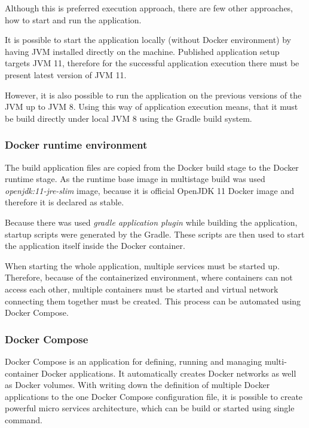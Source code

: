 Although this is preferred execution approach,
there are few other approaches,
how to start and run the application.

It is possible to start the application locally (without Docker environment) by having JVM installed directly on the machine.
Published application setup targets JVM 11, 
therefore for the successful application execution there must be present latest version of JVM 11.

However,
it is also possible to run the application on the previous versions of the JVM up to JVM 8.
Using this way of application execution means,
that it must be build directly under local JVM 8 using the Gradle build system.

\subsubsection{Docker runtime environment}\label{subsubsec:docker-runtime-env}
The build application files are copied from the Docker build stage to the Docker runtime stage.
As the runtime base image in multistage build was used \textit{openjdk:11-jre-slim} image,
because it is official OpenJDK 11 Docker image and therefore it is declared as stable.

Because there was used \textit{gradle application plugin} while building the application, 
startup scripts were generated by the Gradle.
These scripts are then used to start the application itself inside the Docker container.

When starting the whole application, 
multiple services must be started up.
Therefore, because of the containerized environment,
where containers can not access each other,
multiple containers must be started and virtual network connecting them together must be created.
This process can be automated using Docker Compose.

\subsubsection{Docker Compose}
Docker Compose is an application for defining, running and managing multi-container Docker applications.
It automatically creates Docker networks as well as Docker volumes.
With writing down the definition of multiple Docker applications to the one Docker Compose configuration file,
it is possible to create powerful micro services architecture, 
which can be build or started using single command.

